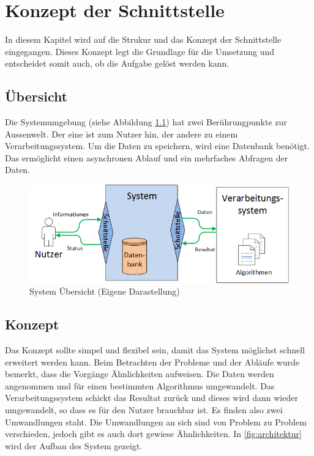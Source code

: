 %
%

\chapter{Konzept der Schnittstelle \resultAssignment{[R4]}}\label{chap.architektur}
In diesem Kapitel wird auf die Strukur und das Konzept der Schnittstelle eingegangen. Dieses Konzept legt die Grundlage für die Umsetzung und entscheidet somit auch, ob die Aufgabe gelöst werden kann.

\section{Übersicht}\label{architektur_uebersicht}
Die Systemumgebung (siehe Abbildung \ref{fig:system_scope}) hat zwei Berührungpunkte zur Aussenwelt. Der eine ist zum Nutzer hin, der andere zu einem Verarbeitungssystem. Um die Daten zu speichern, wird eine Datenbank benötigt. Das ermöglicht einen asynchronen Ablauf und ein mehrfaches Abfragen der Daten.
\begin{figure}[h]
\centering
\includegraphics[scale=0.8]{images/visio/SystemScope.png}
\caption{System Übersicht (Eigene Darastellung)}
\label{fig:system_scope}
\end{figure}

\section{Konzept}\label{arch_backend}
Das Konzept sollte simpel und flexibel sein, damit das System möglichst schnell erweitert werden kann. Beim Betrachten der Probleme und der Abläufe wurde bemerkt, dass die Vorgänge Ähnlichkeiten aufweisen. Die Daten werden angenommen und für einen bestimmten Algorithmus umgewandelt. Das Verarbeitungssystem schickt das Resultat zurück und dieses wird dann wieder umgewandelt, so dass es für den Nutzer brauchbar ist. Es finden also zwei Umwandlungen staht. Die Umwandlungen an sich sind von Problem zu Problem verschieden, jedoch gibt es auch dort gewiese Ähnlichkeiten. In \autoref{fig:architektur} wird der Aufbau des System gezeigt.

